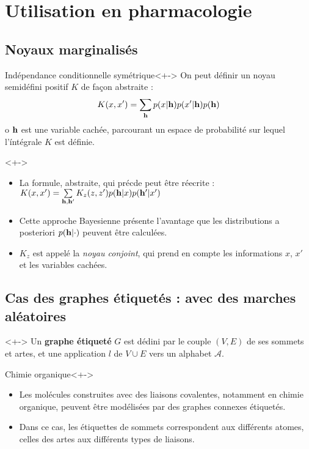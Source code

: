 \section{Utilisation en pharmacologie}

\subsection{Noyaux marginalis\'es}

\begin{frame}
\begin{block}{Ind\'ependance conditionnelle sym\'etrique}<+->
On peut d\'efinir un noyau semid\'efini positif $K$ de fa\c con abstraite :
\[K(x,x')=\sum\limits_{\mathbf{h}}p(x|\mathbf{h})p(x'|\mathbf{h})p(\mathbf{h})\]
o $\mathbf{h}$ est une variable cach\'ee, parcourant un espace de probabilit\'e sur lequel l'\'int\'egrale $K$ est d\'efinie.
\end{block}
\begin{definition}<+->
\begin{itemize}
\item<+-> La formule, abstraite, qui pr\'ecde peut \^etre r\'eecrite : %
$K(x,x')=\sum\limits_{\mathbf{h},\mathbf{h}'}K_z(z,z')p(\mathbf{h}|x)p(\mathbf{h}'|x')$
\item<+-> Cette approche Bayesienne pr\'esente l'avantage que les distributions a posteriori $p(\mathbf{h}|\cdot)$ peuvent \^etre calcul\'ees.
\item<+-> $K_z$ est appel\'e la \emph{noyau conjoint}, qui prend en compte les informations $x$, $x'$ et les variables cach\'ees.
\end{itemize}
\end{definition}
\end{frame}

\subsection{Cas des graphes \'etiquet\'es : avec des marches al\'eatoires}

\begin{frame}
\begin{definition}<+->
Un \textbf{graphe \'etiquet\'e} $G$ est d\'edini par le couple $(V,E)$ de ses sommets et artes, et une application $l$ de $V\cup E$ vers un alphabet $\mathcal{A}$.
\end{definition}
\begin{block}{Chimie organique}<+->
\begin{itemize}
\item<+-> Les mol\'ecules construites avec des liaisons covalentes, notamment en chimie organique, peuvent \^etre mod\'elis\'ees par des graphes connexes \'etiquet\'es.
\item<+-> Dans ce cas, les \'etiquettes de sommets correspondent aux diff\'erents atomes, celles des artes aux diff\'erents types de liaisons.
\end{itemize}
\end{block}
\end{frame}

